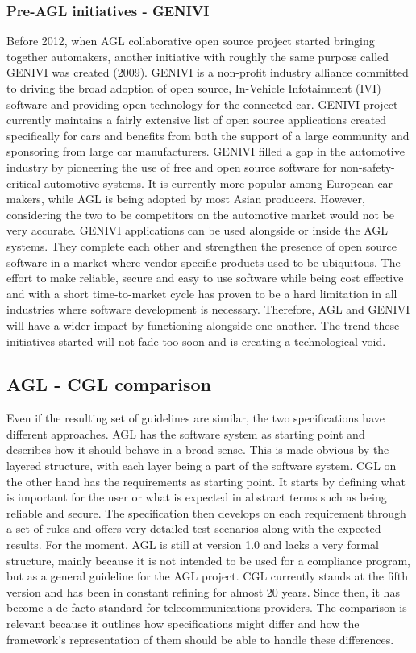 \subsubsection*{Pre-AGL initiatives - GENIVI}
Before 2012, when AGL collaborative open source project started bringing together automakers, another initiative with roughly the same purpose called GENIVI was created (2009). GENIVI is a non-profit industry alliance committed to driving the broad adoption of open source, In-Vehicle Infotainment (IVI) software and providing open technology for the connected car. GENIVI project currently maintains a fairly extensive list of open source applications created specifically for cars and benefits from both the support of a large community and sponsoring from large car manufacturers. GENIVI filled a gap in the automotive industry by pioneering the use of free and open source software for non-safety-critical automotive systems. It is currently more popular among European car makers, while AGL is being adopted by most Asian producers. However, considering the two to be competitors on the automotive market would not be very accurate. GENIVI applications can be used alongside or inside the AGL systems. They complete each other and strengthen the presence of open source software in a market where vendor specific products used to be ubiquitous. The effort to make reliable, secure and easy to use software while being cost effective and with a short time-to-market cycle has proven to be a hard limitation in all industries where software development is necessary. Therefore, AGL and GENIVI will have a wider impact by functioning alongside one another. The trend these initiatives started will not fade too soon and is creating a technological void.

\subsection{AGL - CGL comparison}
Even if the resulting set of guidelines are similar, the two specifications have different approaches. AGL has the software system as starting point and describes how it should behave in a broad sense. This is made obvious by the layered structure, with each layer being a part of the software system. CGL on the other hand has the requirements as starting point. It starts by defining what is important for the user or what is expected in abstract terms such as being reliable and secure. The specification then develops on each requirement through a set of rules and offers very detailed test scenarios along with the expected results. For the moment, AGL is still at version 1.0 and lacks a very formal structure, mainly because it is not intended to be used for a compliance program, but as a general guideline for the AGL project. CGL currently stands at the fifth version and has been in constant refining for almost 20 years. Since then, it has become a de facto standard for telecommunications providers. The comparison is relevant because it outlines how specifications might differ and how the framework's representation of them should be able to handle these differences.

